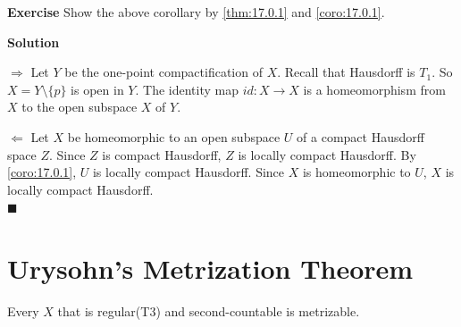 \documentclass[main.tex]{subfiles}
\begin{document}
\par \noindent \textbf{Exercise} Show the above corollary by \ref{thm:17.0.1} and \ref{coro:17.0.1}.
\par \noindent \textbf{Solution} 
\par $\Rightarrow$ Let $Y$ be the one-point compactification of $X$. Recall that Hausdorff is $T_1$. So $X = Y \setminus \{p\}$ is open in $Y$. The identity map $id: X \to X$ is a homeomorphism from $X$ to the open subspace $X$ of $Y$. 
\par $\Leftarrow$ Let $X$ be homeomorphic to an open subspace $U$ of a compact Hausdorff space $Z$. Since $Z$ is compact Hausdorff, $Z$ is locally compact Hausdorff. By \ref{coro:17.0.1}, $U$ is locally compact Hausdorff. Since $X$ is homeomorphic to $U$, $X$ is locally compact Hausdorff.
\mbox{} \\ \null \hfill $\blacksquare$ 

\section{Urysohn's Metrization Theorem}
\begin{theorem}
    Every $X$ that is regular(T3) and second-countable is metrizable.
\end{theorem}
\end{document}
